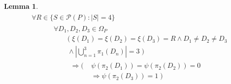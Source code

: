 \documentclass[11pt, oneside]{article}      %
\theoremstyle{definition}
\newtheorem{lem}{Lemma}
\numberwithin{equation}{section}
\theoremstyle{c}
\begin{document}
\begin{lem}
\begin{align}
\begin{split}
&\forall R \in \{ S \in \mathcal{P}(P) : |S| =4 \} \\
&\begin{aligned}\qquad &\forall D_1, D_2, D_3 \in \Omega_P \\
&\qquad (\; \xi(D_1) =\xi(D_2) =\xi(D_3) = R \land D_1 \not= D_2 \not= D_3 \\
&\qquad \land |\bigcup_{n=1}^{3} \pi_1(D_n)|= 3 \; )  \\
&\begin{aligned}\qquad \Rightarrow ( \; &\psi(\pi_2(D_1))  = \psi(\pi_2(D_2))  = 0 \\
&\Rightarrow \psi(\pi_2(D_3))   = 1 \; ) 
\end{aligned} \end{aligned} \end{split}
\end{align}
\end{lem}
\end{document}

